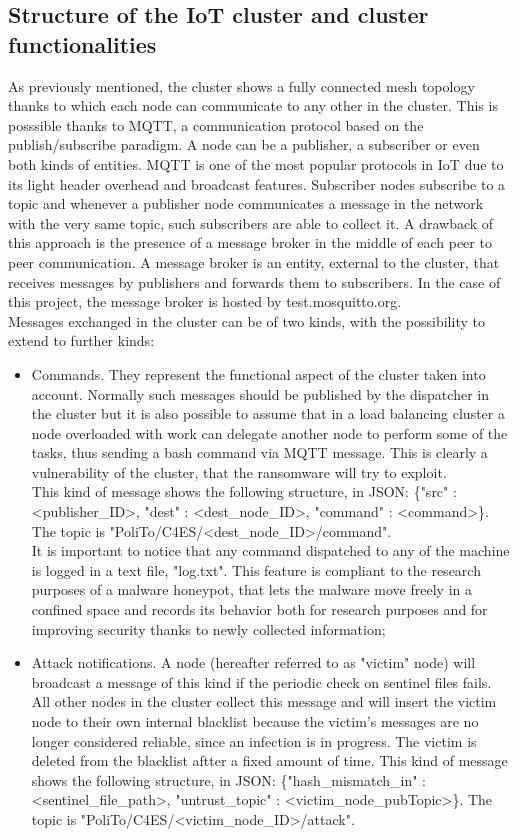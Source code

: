 \subsection{Structure of the IoT cluster and cluster functionalities}

As previously mentioned, the cluster shows a fully connected mesh topology thanks to which each node can communicate to any other in the cluster. This is posssible thanks to MQTT, a communication protocol based on the publish/subscribe paradigm. A node can be a publisher, a subscriber or even both kinds of entities. MQTT is one of the most popular protocols in IoT due to its light header overhead and broadcast features. Subscriber nodes subscribe to a topic and whenever a publisher node communicates a message in the network with the very same topic, such subscribers are able to collect it. A drawback of this approach is the presence of a message broker in the middle of each peer to peer communication. A message broker is an entity, external to the cluster, that receives messages by publishers and forwards them to subscribers. In the case of this project, the message broker is hosted by test.mosquitto.org.\\
Messages exchanged in the cluster can be of two kinds, with the possibility to extend to further kinds:

\begin{itemize}
  \item Commands. They represent the functional aspect of the cluster taken into account. Normally such messages should be published by the dispatcher in the cluster but it is also possible to assume that in a load balancing cluster a node overloaded with work can delegate another node to perform some of the tasks, thus sending a bash command via MQTT message. This is clearly a vulnerability of the cluster, that the ransomware will try to exploit.\\
This kind of message shows the following structure, in JSON: \{"src" : <publisher\_ID>, "dest" : <dest\_node\_ID>, "command" : <command>\}. The topic is "PoliTo/C4ES/<dest\_node\_ID>/command".\\
It is important to notice that any command dispatched to any of the machine is logged in a text file, "log.txt". This feature is compliant to the research purposes of a malware honeypot, that lets the malware move freely in a confined space and records its behavior both for research purposes and for improving security thanks to newly collected information;
  \item Attack notifications. A node (hereafter referred to as "victim" node) will broadcast a message of this kind if the periodic check on sentinel files fails. All other nodes in the cluster collect this message and will insert the victim node to their own internal blacklist because the victim's messages are no longer considered reliable, since an infection is in progress. The victim is deleted from the blacklist aftter a fixed amount of time.
This kind of message shows the following structure, in JSON: \{"hash\_mismatch\_in" : <sentinel\_file\_path>, "untrust\_topic" : <victim\_node\_pubTopic>\}. The topic is "PoliTo/C4ES/<victim\_node\_ID>/attack".
\end{itemize}


